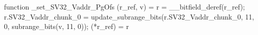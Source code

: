 function _set_SV32_Vaddr_PgOfs (r_ref, v) = {
    r = __bitfield_deref(r_ref);
    r.SV32_Vaddr_chunk_0 = update_subrange_bits(r.SV32_Vaddr_chunk_0, 11, 0, subrange_bits(v, 11, 0));
    (*r_ref) = r
}
